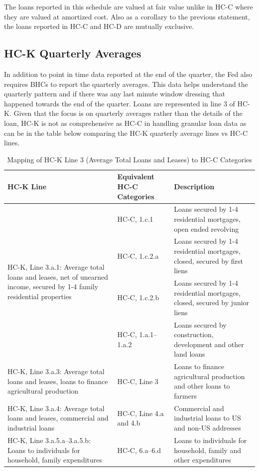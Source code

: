 \documentclass[conference]{IEEEtran}
\begin{document}
	
	The loans reported in this schedule are valued at fair value unlike in HC-C where they are valued at amortized cost. Also as a corollary to the previous statement, the loans reported in HC-C and HC-D are mutually exclusive.
	
	\subsection{HC-K Quarterly Averages}
	In addition to point in time data reported at the end of the quarter, the Fed also requires BHCs to report the quarterly averages. This data helps understand the quarterly pattern and if there was any last minute window dressing that happened towards the end of the quarter. Loans are represented in line 3 of HC-K. Given that the focus is on quarterly averages rather than the details of the loan, HC-K is not as comprehensive as HC-C in handling granular loan data as can be in the table below comparing the HC-K quarterly average lines vs HC-C lines.
	
\begin{table}[htbp]
	\centering
	\caption{Mapping of HC-K Line 3 (Average Total Loans and Leases) to HC-C Categories}
	\begin{tabular}{|p{2.2cm}|p{1.5cm}|p{4cm}|}
		\hline
		\textbf{HC-K Line} & \textbf{Equivalent HC-C Categories} & \textbf{Description} \\
		\hline
		\multirow{4}{*}{\parbox{2.2cm}{HC-K, Line 3.a.1: Average total loans and leases, net of unearned income, secured by 1-4 family residential properties}} 
		& HC-C, 1.c.1 & Loans secured by 1-4 residential mortgages, open ended revolving \\
		\cline{2-3}
		& HC-C, 1.c.2.a & Loans secured by 1-4 residential mortgages, closed, secured by first liens \\
		\cline{2-3}
		& HC-C, 1.c.2.b & Loans secured by 1-4 residential mortgages, closed, secured by junior liens \\
		\hline
		\parbox{2.2cm}{HC-K, Line 3.a.2: Average total loans and leases, all other loans secured by real estate}
		& HC-C, 1.a.1--1.a.2 & Loans secured by construction, development and other land loans \\
		\hline
		\parbox{2.2cm}{HC-K, Line 3.a.3: Average total loans and leases, loans to finance agricultural production}
		& HC-C, Line 3 & Loans to finance agricultural production and other loans to farmers \\
		\hline
		\parbox{2.2cm}{HC-K, Line 3.a.4: Average total loans and leases, commercial and industrial loans}
		& HC-C, Line 4.a and 4.b & Commercial and industrial loans to US and non-US addresses \\
		\hline
		\parbox{2.2cm}{HC-K, Line 3.a.5.a--3.a.5.b: Loans to individuals for household, family expenditures}
		& HC-C, 6.a--6.d & Loans to individuals for household, family and other expenditures \\
		\hline
	\end{tabular}
\end{table}
\end{document}
